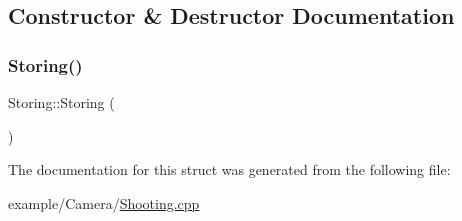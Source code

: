 \subsection{Constructor \& Destructor Documentation}
\mbox{\label{struct_storing_abb1214e2f3bdef69373e27950ec1f55e}} 
\subsubsection{\texorpdfstring{Storing()}{Storing()}}
{\footnotesize\ttfamily Storing\+::\+Storing (\begin{DoxyParamCaption}{ }\end{DoxyParamCaption})\hspace{0.3cm}{\ttfamily [inline]}}



The documentation for this struct was generated from the following file\+:\begin{DoxyCompactItemize}
\item 
example/\+Camera/\mbox{\hyperlink{_shooting_8cpp}{Shooting.\+cpp}}\end{DoxyCompactItemize}
